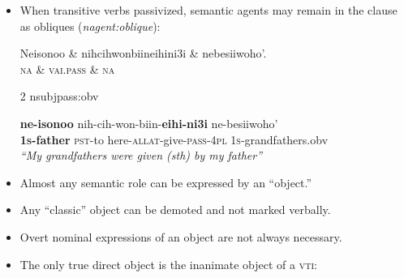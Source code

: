 \documentclass[portrait,a0paper,fontscale=0.36]{baposter} %
\newcommand{\compresslist}{ %
\setlength{\itemsep}{1pt}
\setlength{\parskip}{0pt}
\setlength{\parsep}{0pt}
}
\begin{document}
\begin{poster}
{\begin{itemize}
\begin{exe}
\begin{dependency}
\end{dependency}
\gll \textbf{hi-niisonoon} {heen-ei'itowuun-eit}.\\
\textsc{3s}-father.obv {\textsc{redup}-tell s.o.-\textsc{4/3s}}\\
\trans \textit{His father tells him.}
\end{exe}
\normalsize
\item When transitive verbs passivized, semantic agents may remain in the clause as obliques (\textit{nagent:oblique}):
 \small
\begin{exe}
\ex \label{middle}
\begin{dependency}
\begin{deptext}
Neisonoo \& nihcihwonbiineihini3i \& nebesiiwoho'.\\
\textsc{na} \& \textsc{vai.pass}	\& \textsc{na}\\
\end{deptext}
	{2}	{nsubjpass:obv}
\end{dependency}
\begin{adjustwidth*}{-0.6in}{-0.6in}
\gll \textbf{ne-isonoo} {nih-cih-won-biin-\textbf{eihi-ni3i}} {ne-besiiwoho'} \\
\textbf{\textsc{1s}-father} {\textsc{pst}-to here-\textsc{allat}-give-\textsc{pass}-\textsc{4pl}} \textsc{1s}-grandfathers.obv\\
\trans \textit{``My grandfathers were given (sth) by my father''}
\end{adjustwidth*}
\end{exe}
\normalsize
\end{itemize}
}
{
\begin{itemize} \compresslist
\item Almost any semantic role can be expressed by an ``object.''
\item Any ``classic'' object can be demoted and not marked verbally.
\item Overt nominal expressions of an object are not always necessary.
\item The only true direct object is the inanimate object of a \textsc{vti}:


\end{itemize}}
\end{poster}
\end{document}
